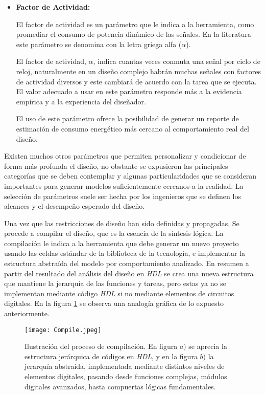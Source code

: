 \begin{itemize}
\item \textbf{Factor de Actividad:} {El factor de actividad es un parámetro que le indica a la herramienta, como promediar el consumo de potencia dinámico de las señales. En la literatura este parámetro se denomina con la letra griega alfa (\textbf{$\alpha$}).

El factor de actividad, $\alpha$, indica cuantas veces conmuta una señal por ciclo de reloj, naturalmente en un diseño complejo habrán muchas señales con factores de actividad diversos y este cambiará de acuerdo con la tarea que se ejecuta. El valor adecuado a usar en este parámetro responde más a la evidencia empírica y a la experiencia del diseñador.\cite{book:weste2005}

El uso de este parámetro ofrece la posibilidad de generar un reporte de estimación de consumo energético más cercano al comportamiento real del diseño.}
\end{itemize}

Existen muchos otros parámetros que permiten personalizar y condicionar de forma más profunda el diseño, no obstante se expusieron las principales categorías que se deben contemplar y algunas particularidades que se consideran importantes para generar modelos suficientemente cercanos a la realidad. La selección de parámetros suele ser hecha por los ingenieros que se definen los alcances y el desempeño esperado del diseño.

Una vez que las restricciones de diseño han sido definidas y propagadas. Se procede a compilar el diseño, que es la esencia de la síntesis lógica. La compilación le indica a la herramienta que debe generar un nuevo proyecto usando las celdas estándar de la biblioteca de la tecnología, e implementar la estructura abstraída del modelo por comportamiento analizado. En resumen a partir del resultado del análisis del diseño en \textit{HDL} se crea una nueva estructura que mantiene la jerarquía de las funciones y tareas, pero estas ya no se implementan mediante código \textit{HDL} si no mediante elementos de circuitos digitales. En la figura \ref{comp} se observa una analogía gráfica de lo expuesto anteriormente.

\begin{figure}[h]
\texttt{[image: Compile.jpeg]}
\centering
\caption{Ilustración del proceso de compilación. En figura \textbf{$a)$} se aprecia la estructura jerárquica de códigos en \textit{HDL}, y en la figura \textbf{$b)$} la jerarquía abstraída, implementada mediante distintos niveles de elementos digitales, pasando desde funciones complejas, módulos digitales avanzados, hasta compuertas lógicas fundamentales.}
\label{comp}
\end{figure}

